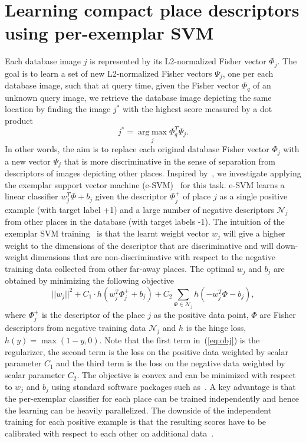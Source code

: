 \documentclass[10pt,twocolumn,letterpaper]{article}
\begin{document}
\section{Learning compact place descriptors using per-exemplar SVM}
\label{sec:perExemplar}
   Each database image $j$ is represented by its L2-normalized Fisher vector $\Phi_j$. The goal is to learn a set of new L2-normalized Fisher vectors $\Psi_j$, one per each database image, such that at query time, given the Fisher vector $\Phi_q$ of an unknown query image, we retrieve the database image depicting the same location by finding the image $j^*$ with the highest score measured by a dot product
   \begin{equation}
       j^*=\operatorname*{arg\;max}_{j} \Phi_q^T \Psi_j. 
       \label{eq:class}
   \end{equation}
   In other words, the aim is to replace each original database Fisher vector $\Phi_j$ with a new vector $\Psi_j$ that is more discriminative in the sense of separation from descriptors of images depicting other places. Inspired by~\cite{Gronat13}, we investigate applying the exemplar support vector machine (e-SVM)~\cite{Malisiewicz11} for this task. e-SVM learns a linear classifier $w_j^T\Phi+b_j$ given the descriptor $\Phi_j^+$ of place $j$ as a single positive example (with target label +1) and a large number of negative descriptors $\mathcal N_j$ from other places in the database (with target labels -1). The intuition of the exemplar SVM training~\cite{Malisiewicz11} is that the learnt weight vector $w_j$ will give a higher weight to the dimensions of the descriptor that are discriminative and will down-weight dimensions that are non-discriminative with respect to the negative training data collected from other far-away places.  The optimal $w_j$ and $b_j$ are obtained by minimizing the following objective  
      \begin{equation}
         ||w_j||^{2} +C_1 \cdot h
            \left(
               w_j^T\Phi^+_j+b_j
            \right)
            +C_2\sum_{\Phi\in \mathcal N_j}h
            \left(
               -w_j^T\Phi-b_j
            \right),   
         \label{eq:obj} 
      \end{equation}
   where $\Phi^+_j$ is the descriptor of the place $j$ as the positive data point, $\Phi$ are Fisher descriptors from negative training data $\mathcal N_j$ and $h$ is the hinge loss, $h(y) = \max(1-y,0)$. Note that the first term in~(\ref{eq:obj}) is the regularizer, the second term is the loss on the positive data weighted by scalar parameter $C_1$ and the third term is the loss on the negative data weighted by scalar parameter $C_2$. The objective is convex and can be minimized with respect to $w_j$ and $b_j$ using standard software packages such as~\cite{libsvm}. A key advantage is that the per-exemplar classifier for each place can be trained independently and hence the learning can be heavily parallelized. The downside of the independent training for each positive example is that the resulting scores have to be calibrated with respect to each other on additional data~\cite{Gronat13,Malisiewicz11}.
   
\end{document}
